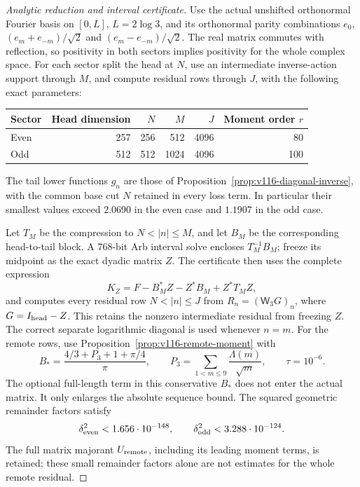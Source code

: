 \begin{proof}[Analytic reduction and interval certificate]
Use the actual unshifted orthonormal Fourier basis on $[0,L]$,
$L=2\log3$, and its orthonormal parity combinations
$e_0$, $(e_m+e_{-m})/\sqrt2$ and
$(e_m-e_{-m})/\sqrt2$. The real matrix commutes with reflection, so
positivity in both sectors implies positivity for the whole complex
space. For each sector split the head at $N$, use an intermediate
inverse-action support through $M$, and compute residual rows through
$J$, with the following exact parameters:
\begin{center}
\begin{tabular}{lrrrrr}
\toprule
Sector & Head dimension & $N$ & $M$ & $J$ & Moment order $r$\\
\midrule
Even &257&256&512&4096&80\\
Odd  &512&512&1024&4096&100\\
\bottomrule
\end{tabular}
\end{center}
The tail lower functions $g_n$ are those of
Proposition~\ref{prop:v116-diagonal-inverse}, with the common base cut $N$
retained in every loss term. In particular their smallest values exceed
$2.0690$ in the even case and $1.1907$ in the odd case.

Let $T_M$ be the compression to $N<|n|\le M$, and let $B_M$ be the
corresponding head-to-tail block. A 768-bit Arb interval solve encloses
$T_M^{-1}B_M$; freeze its midpoint as the exact dyadic matrix $Z$.
The certificate then uses the complete expression
\[
 K_Z=F-B_M^*Z-Z^*B_M+Z^*T_MZ,
\]
and computes every residual row $N<|n|\le J$ from
$R_n=(\mathsf W_3G)_n$, where $G=I_{\rm head}-Z$.
This retains the nonzero intermediate residual from freezing $Z$.
The correct separate logarithmic diagonal is used whenever $n=m$.
For the remote rows, use
Proposition~\ref{prop:v116-remote-moment} with
\[
 B_* =\frac{4/3+P_3+1+\pi/4}{\pi},\qquad
 P_3=\sum_{1<m\le9}\frac{\Lambda(m)}{\sqrt m},\qquad
 \tau=10^{-6}.
\]
The optional full-length term in this conservative $B_*$ does not
enter the actual matrix. It only enlarges the absolute sequence bound.
The squared geometric remainder factors satisfy
\[
 \delta^2_{\rm even}<1.656\cdot10^{-148},\qquad
 \delta^2_{\rm odd}<3.288\cdot10^{-124}.
\]
The full matrix majorant $U_{\rm remote}$, including its leading
moment terms, is retained; these small remainder factors alone are not
estimates for the whole remote residual.


\end{proof}
